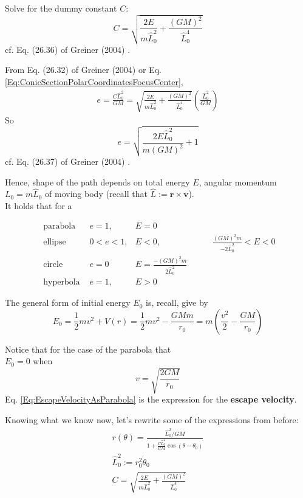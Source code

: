 \documentclass[10pt]{amsart}
\begin{document}
\begin{multicols*}{2}
Solve for the dummy constant $C$:
\begin{equation}
C = \sqrt{ \frac{2E}{m \widehat{L}_0^2 } + \frac{ (GM)^2 }{ \widehat{L}_0^4 } }
\end{equation}
cf. Eq. (26.36) of Greiner (2004) \cite{Grei2004}.

From Eq. (26.32) of Greiner (2004) \cite{Grei2004} or Eq. \ref{Eq:ConicSectionPolarCoordinatesFocusCenter}, 
\[
\begin{gathered}
e = \frac{C \widehat{L}_0^2 }{ GM} = \sqrt{ \frac{2 E }{ m \widehat{L}_0^2} + \frac{ (GM)^2 }{\widehat{L}_0^4 } } \left( \frac{\widehat{L}_0^2 }{ GM} \right)  
\end{gathered}
\]
So
\begin{equation}
\boxed{ e =  \sqrt{ \frac{ 2 E \widehat{L}_0^2 }{ m (GM)^2 } + 1 } }
\end{equation}
cf. Eq. (26.37) of Greiner (2004) \cite{Grei2004}. 

Hence, shape of the path depends on total energy $E$, angular momentum $L_0 = m \widehat{L}_0$ of moving body (recall that $\widehat{L} := \mathbf{r} \times \mathbf{v}$). \\

It holds that for a

\[
\begin{aligned} 
\text{ parabola } & e = 1, & E = 0 & \\  
\text{ ellipse } & 0 < e < 1, & E < 0, & \qquad \, \frac{ (GM)^2 m }{ -2 \widehat{L}_0^2 } < E < 0 \\  
\text{ circle } &  e = 0 & E = \frac{ -(GM)^2 m }{ 2\widehat{L}_0^2 } & \\
\text{ hyperbola } & e = 1, & E > 0 & \, 
\end{aligned} 
\]

The general form of initial energy $E_0$ is, recall, give by
\[
E_0 = \frac{1}{2} m v^2 + V(r) = \frac{1}{2} mv^2 - \frac{GMm}{r_0} = m \left( \frac{v^2}{2} - \frac{GM}{r_0} \right) 
\]

Notice that for the case of the parabola that \\
$E_0 =0 $ when 
\begin{equation}\label{Eq:EscapeVelocityAsParabola}
v = \sqrt{ \frac{2GM}{r_0} } 
\end{equation}
Eq. \ref{Eq:EscapeVelocityAsParabola} is the expression for the \textbf{escape velocity}.

Knowing what we know now, let's rewrite some of the expressions from before:
\[
\begin{gathered} 
r(\theta) = \frac{ \widehat{L}_0^2 / GM}{ 1 + \frac{C \widehat{L}_0^2 }{GM} \cos{(\theta - \theta_0)} } \\ 
\widehat{L}_0^2 := r_0^2 \dot{\theta}_0 \\ 
C = \sqrt{\frac{ 2 E}{ m \widehat{L}_0^2 } + \frac{ (GM)^2 }{ \widehat{L}_0^4 } }
\end{gathered} 
\]


\end{multicols*}
\end{document}

